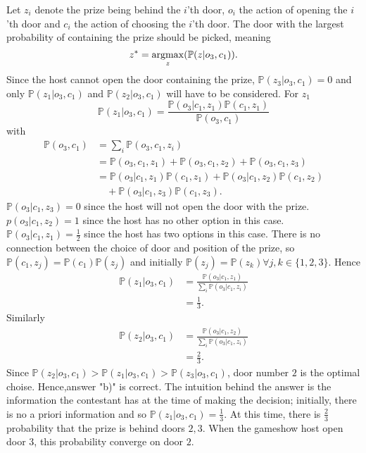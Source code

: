 \begin{example}
	Let $z_i$ denote the prize being behind the $i$'th door, $o_i$ the action of opening the $i$'th door and $c_i$ the action of choosing the $i$'th door. The door with the largest probability of containing the prize should be picked, meaning
	\begin{equation}
		z^*=\operatorname*{argmax}_z(\mathbb{P}(z|o_3,c_1)).
	\end{equation}
	Since the host cannot open the door containing the prize, $\mathbb{P}(z_3|o_3,c_1)=0$ and only $\mathbb{P}(z_1|o_3,c_1)$ and $\mathbb{P}(z_2|o_3,c_1)$ will have to be considered. For $z_1$
	\begin{equation}
		\mathbb{P}(z_1|o_3,c_1) = \frac{\mathbb{P}(o_3|c_1,z_1)\mathbb{P}(c_1,z_1)}{\mathbb{P}(o_3,c_1)}
	\end{equation}
	with
	\begin{equation}
		\begin{split}
			\mathbb{P}(o_3,c_1)&=\sum_i\mathbb{P}(o_3,c_1,z_i)\\
			&=\mathbb{P}(o_3,c_1,z_1)+\mathbb{P}(o_3,c_1,z_2)+\mathbb{P}(o_3,c_1,z_3)\\
			&= \mathbb{P}(o_3|c_1,z_1)\mathbb{P}(c_1,z_1)+\mathbb{P}(o_3|c_1,z_2)\mathbb{P}(c_1,z_2)\\
			&\quad+\mathbb{P}(o_3|c_1,z_3)\mathbb{P}(c_1,z_3).
		\end{split}
	\end{equation}
	$\mathbb{P}(o_3|c_1,z_3)=0$ since the host will not open the door with the prize. $p(o_3|c_1,z_2)=1$ since the host has no other option in this case. $\mathbb{P}(o_3|c_1,z_1)=\frac{1}{2}$ since the host has two options in this case. There is no connection between the choice of door and position of the prize, so $\mathbb{P}(c_1, z_j)=\mathbb{P}(c_1)\mathbb{P}(z_j)$ and initially $\mathbb{P}(z_j)=\mathbb{P}(z_k)\forall j,k\in \{1,2,3\}$. Hence
	\begin{equation}
		\begin{split}
			\mathbb{P}(z_1|o_3,c_1) &= \frac{\mathbb{P}(o_3|c_1,z_1)}{\sum_i\mathbb{P}(o_3|c_1,z_i)}\\
			&=\frac{1}{3}.
		\end{split}
	\end{equation}
	Similarly
	\begin{equation}
		\begin{split}
			\mathbb{P}(z_2|o_3,c_1) &= \frac{\mathbb{P}(o_3|c_1,z_2)}{\sum_i\mathbb{P}(o_3|c_1,z_i)}\\
			&=\frac{2}{3}.
		\end{split}
	\end{equation}
	Since $\mathbb{P}(z_2|o_3,c_1)>\mathbb{P}(z_1|o_3,c_1)>\mathbb{P}(z_3|o_3,c_1)$, door number $2$ is the optimal choise. Hence,answer "b)" is correct. The intuition behind the answer is the information the contestant has at the time of making the decision; initially, there is no a priori information and so $\mathbb{P}(z_1|o_3,c_1)=\frac{1}{3}$. At this time, there is $\frac{2}{3}$ probability that the prize is behind doors $2,3$. When the gameshow host open door $3$, this probability converge on door $2$.
\end{example}

